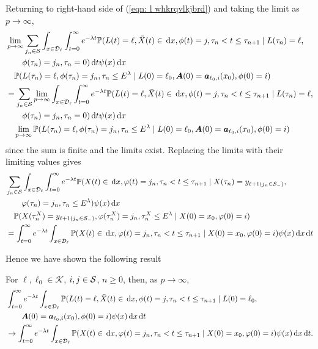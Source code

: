 Returning to right-hand side of (\ref{eqn: l whkrqvlkjbrd}) and taking the limit as \(p\to\infty\), 
\begin{align}
	&\lim_{p\to\infty} \sum_{j_n\in\mathcal S}
	\int_{x\in\mathcal{D}_\ell} \int_{t=0}^\infty e^{-\lambda t} \mathbb P(L(t) = \ell, \bar X(t) \in \, \mathrm{d} x, \phi(t) = j, 
	\tau_n<t \leq \tau_{n+1} \mid L(\tau_n) = \ell, \nonumber 
	 \\&\qquad{}\phi(\tau_n) = j_n, \tau_{n}= 0)\, \mathrm{d} t \psi(x)\, \mathrm{d} x \nonumber
	 \\&\quad \mathbb P(L(\tau_n) = \ell, \phi(\tau_n) = j_n, \tau_{n}\leq E^\lambda 
	 \mid L(0)=\ell_0, \boldsymbol A(0)=\boldsymbol  a_{\ell_0,i}(x_0), \phi(0)=i)\nonumber
	 \\&= \sum_{j_n\in\mathcal S}
	\lim_{p\to\infty} \int_{x\in\mathcal{D}_\ell} \int_{t=0}^\infty e^{-\lambda t}  \mathbb P(L(t) = \ell, \bar X(t) \in \, \mathrm{d} x, \phi(t) = j, 
	\tau_n<t \leq \tau_{n+1} \mid L(\tau_n) = \ell, \nonumber 
	 \\&\qquad{}\phi(\tau_n) = j_n, \tau_{n}= 0)\, \mathrm{d} t \psi(x)\, \mathrm{d} x \nonumber
	 \\&\quad{} \lim_{p\to\infty} \mathbb P(L(\tau_n) = \ell, \phi(\tau_n) = j_n, \tau_{n}\leq E^\lambda 
	 \mid L(0)=\ell_0, \boldsymbol A(0)=\boldsymbol  a_{\ell_0,i}(x_0), \phi(0)=i)\nonumber
\end{align}
since the sum is finite and the limits exist. Replacing the limits with their limiting values gives 
\begin{align}
	 &\sum_{j_n\in\mathcal S}\int_{x\in\mathcal{D}_\ell} \int_{t=0}^\infty e^{-\lambda t} \mathbb P(X(t)\in\, \mathrm{d} x, \varphi(t)=j_n, \tau_n < t \leq \tau_{n+1} \mid X(\tau_n) = y_{\ell+1(j_n\in\mathcal S_-)}, \nonumber 
	\\&\qquad{} \varphi(\tau_n)=j_n, \tau_n\leq E^\lambda ) \psi(x)\, \mathrm{d} x\nonumber
	\\&\quad{}\mathbb P(X(\tau_n^X) = y_{\ell+1(j_{n}\in\mathcal S_-)}, 
		\varphi(\tau_n^X) = j_n, \tau_{n}^X\leq E^\lambda
		\mid X(0)=x_0, \varphi(0)=i)\nonumber
	\\&= \int_{t=0}^\infty e^{-\lambda t}  \int_{x\in\mathcal{D}_\ell}\mathbb P(X(t)\in\, \mathrm{d} x, \varphi(t)=j_n, \tau_n < t \leq \tau_{n+1} 
	\mid X(0)=x_0, \varphi(0)=i)\psi(x)\, \mathrm{d} x\, \mathrm{d} t
\end{align}

Hence we have shown the following result 
\begin{lem}\label{lem: LAkAKFnvnb mav h}
	For \(\ell,\ell_0\in\mathcal K\), \(i,j\in\mathcal{S}\), \(n\geq 0\), then, as \(p\to\infty\), 
	\begin{align}
		&\int_{t=0}^\infty e^{-\lambda t}\int_{x\in\mathcal{D}_\ell}\mathbb P(L(t) = \ell, \bar X(t)\in\, \mathrm{d} x, \phi(t) = j, \tau_{n}< t\leq\tau_{n+1} \mid L(0)=\ell_0,  \nonumber 
		\\&\qquad \boldsymbol A(0)=\boldsymbol a_{\ell_0,i}(x_0), \phi(0)=i)\psi(x)\, \mathrm{d} x\, \mathrm{d} t \nonumber
		\\&\to\int_{t=0}^\infty e^{-\lambda t}  \int_{x\in\mathcal{D}_\ell}\mathbb P(X(t)\in\, \mathrm{d} x, \varphi(t)=j_n, \tau_n < t \leq \tau_{n+1} 
		\mid X(0)=x_0, \varphi(0)=i)\psi(x)\, \mathrm{d} x\, \mathrm{d} t.
	\end{align}
\end{lem}

